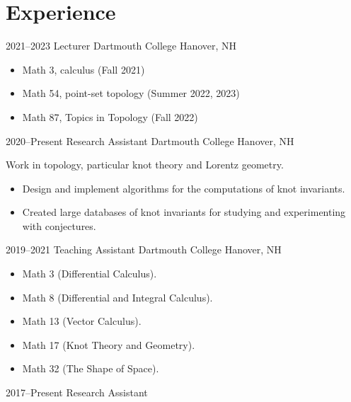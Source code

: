 \documentclass[a4paper,sans]{moderncv}
\begin{document}
    \section{Experience}
        \cventry%
            {2021--2023}
            {Lecturer}
            {Dartmouth College}
            {Hanover, NH}
            {}
            {%
                \begin{itemize}
                    \item Math 3, calculus (Fall 2021)
                    \item Math 54, point-set topology (Summer 2022, 2023)
                    \item Math 87, Topics in Topology (Fall 2022)
                \end{itemize}
            }
        \cventry%
            {2020--Present}
            {Research Assistant}
            {Dartmouth College}
            {Hanover, NH}
            {}
            {%
                Work in topology, particular knot theory and Lorentz geometry.
                \begin{itemize}
                    \item
                        Design and implement algorithms for the computations of
                        knot invariants.
                    \item
                        Created large databases of knot invariants for studying
                        and experimenting with conjectures.
                \end{itemize}%
             }
        \cventry%
            {2019--2021}
            {Teaching Assistant}
            {Dartmouth College}
            {Hanover, NH}
            {}
            {%
                \begin{itemize}
                    \item
                        Math 3 (Differential Calculus).
                    \item
                        Math 8 (Differential and Integral Calculus).
                    \item
                        Math 13 (Vector Calculus).
                    \item
                        Math 17 (Knot Theory and Geometry).
                    \item
                        Math 32 (The Shape of Space).
                \end{itemize}
            }
        \cventry%
            {2017--Present}
            {Research Assistant}
\end{document}
